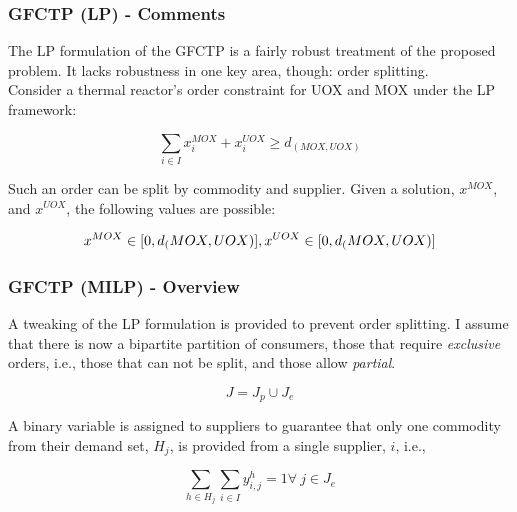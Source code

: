 \begin{frame}[ctb!]
  \frametitle{GFCTP (LP) - Comments} 

  The LP formulation of the GFCTP is a fairly robust treatment of the proposed
  problem. It lacks robustness in one key area, though: order splitting.\\

  Consider a thermal reactor's order constraint for UOX and MOX under the LP
  framework:

  \begin{equation}
    \sum_{i \in I} x_{i}^{MOX} + x_{i}^{UOX} \geq d_({MOX,UOX})
  \end{equation} 

  Such an order can be split by commodity and supplier. Given a solution,
  $x^{MOX}$, and $x^{UOX}$, the following values are possible:

  \begin{equation}
    x^{MOX} \in [0, d_({MOX,UOX})], \\
    x^{UOX} \in [0, d_({MOX,UOX})]
  \end{equation} 

\end{frame}

\begin{frame}[ctb!]
  \frametitle{GFCTP (MILP) - Overview}

  A tweaking of the LP formulation is provided to prevent order splitting. I
  assume that there is now a bipartite partition of consumers, those that
  require \textit{exclusive} orders, i.e., those that can not be split, and
  those allow \textit{partial}.

  \begin{equation}\label{eqs:consumer-union}
    J = J_{p} \cup J_{e}
  \end{equation}

  A binary variable is assigned to suppliers to guarantee that only one
  commodity from their demand set, $H_j$, is provided from a single supplier,
  $i$, i.e.,

  \begin{equation}
    \sum_{h \in H_j}\sum_{i \in I} y_{i,j}^{h} = 1
    \forall \: j \in J_{e}
  \end{equation}
  
\end{frame}

